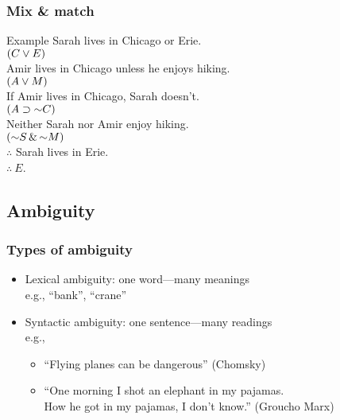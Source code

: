 \begin{frame}
  \frametitle{Mix \& match}

  \begin{block}{Example}
  Sarah lives in Chicago or Erie.\\
  \alert{$(C \vee E)$}\\
  Amir lives in Chicago unless he enjoys hiking.\\
  \alert{$(A \vee M)$}\\
  If Amir lives in Chicago, Sarah doesn't.\\
  \alert{$(A \eif \enot C)$}\\
  Neither Sarah nor Amir enjoy hiking.\\
  \alert{$( \enot S \eand\enot M)$}\\
  $\therefore$ Sarah lives in Erie.\\
  \alert{$\therefore\ E$}.
  \end{block}
\end{frame}

\subsection{Ambiguity}

\begin{frame}
    \frametitle{Types of ambiguity}

\begin{itemize}
  \item Lexical ambiguity: one word---many meanings \\
  e.g., ``bank'', ``crane''
  \item Syntactic ambiguity: one sentence---many readings\\
  e.g.,
  \begin{itemize}
  \item ``Flying planes can be dangerous'' (Chomsky)
  \item ``One morning I shot an elephant in my pajamas.\\ How he got in my pajamas, I don't know.'' (Groucho Marx)
  \end{itemize}
\end{itemize}

\end{frame}

